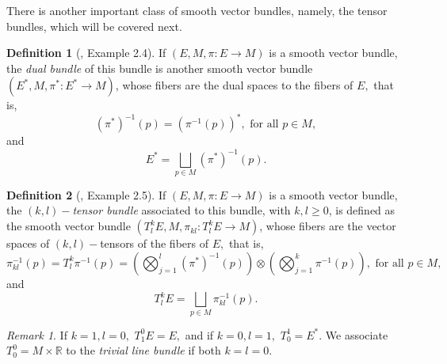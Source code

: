 \documentclass[12pt, letterpaper, reqno]{amsart}
\theoremstyle{definition}
\newtheorem{df}{Definition}
\theoremstyle{plain}
\theoremstyle{remark}
\newtheorem{rem}{Remark}
\begin{document}
There is another important class of smooth vector bundles, namely, the tensor bundles, which will be covered next.
\begin{df}[\cite{wendl2008lecture}, Example 2.4] 
	If $ (E,M,\pi:E \rightarrow {M}) $ is a smooth vector bundle, the \textit{dual bundle} of this bundle is another smooth vector bundle $ (E^*,M,\pi^*:E^*\rightarrow {M}) $, whose fibers are the dual spaces to the fibers of $ E, $ that is,
	$$ (\pi^{*})^{-1}(p)=(\pi^{-1}(p))^*, \text{ for all }p\in M,$$ 
	and $$ E^* =\bigsqcup_{p\in M} (\pi^*)^{-1}(p). $$ 
\end{df}
\begin{df}[\cite{wendl2008lecture}, Example 2.5]
	If $ (E,M,\pi:E \rightarrow {M}) $ is a smooth vector bundle, the \textit{$ (k,l)- $tensor bundle} associated to this bundle, with $ k,l\geq0 $, is defined as the smooth vector bundle $ (T^k_l E, M, \pi_{kl}: T^k_l E \rightarrow {M}) $, whose fibers are the vector spaces of $ (k,l) -$tensors of the fibers of $ E, $ that is,     
	$$ \pi_{kl}^{-1}(p) = T^k_l \pi^{-1}(p)=\left( \bigotimes_{j=1}^l (\pi^{*})^{-1}(p)\right)\otimes \left( \bigotimes_{j=1}^k \pi^{-1}(p) \right), \text{ for all }p\in M, $$ 
	and
	$$ T^k_l E = \bigsqcup_{p\in M} \pi_{kl}^{-1}(p). $$ 
\end{df}
\begin{rem}
	If $ k=1,l=0, $ $T^0_1E=E,$ and if $ k=0,l=1, $ $ T^1_0=E^*. $ We associate $ T^0_0=M\times \mathbb{R} $ to the \textit{trivial line bundle} if both $ k=l=0. $ 
\end{rem}
\end{document}
